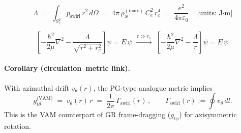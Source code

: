\documentclass[11pt]{article}
\begin{document}

    \[
        \boxed{\, \Lambda \;=\; \int_{S_r^2} p_{\text{swirl}}\,r^2\,d\Omega
        \;=\; 4\pi\,\rho_{\text{\ae}}^{(\text{mass})}\,C_e^2\,r_c^4
        \;=\; \frac{e^2}{4\pi\varepsilon_0} \,}
        \quad\text{[units: J·m]}
    \]

    \[
        \boxed{\,
        \left[-\frac{\hbar^2}{2\mu}\nabla^2 - \frac{\Lambda}{\sqrt{r^2+r_c^2}}\right]\psi = E\,\psi
        \;\xrightarrow{\,r\gg r_c\,}\;
        \left[-\frac{\hbar^2}{2\mu}\nabla^2 - \frac{\Lambda}{r}\right]\psi = E\,\psi
        \,}
    \]
    \paragraph*{Corollary (circulation–metric link).}
    With azimuthal drift $v_\theta(r)$, the PG-type analogue metric implies
    \[
        \boxed{\, g_{t\theta}^{\text{(VAM)}} \;=\; v_\theta(r)\,r \;=\; \frac{1}{2\pi}\,\Gamma_{\text{swirl}}(r) \,},
        \qquad \Gamma_{\text{swirl}}(r) := \oint v_\theta\,dl.
    \]
    This is the VAM counterpart of GR frame-dragging ($g_{t\phi}$) for axisymmetric rotation.
\end{document}
